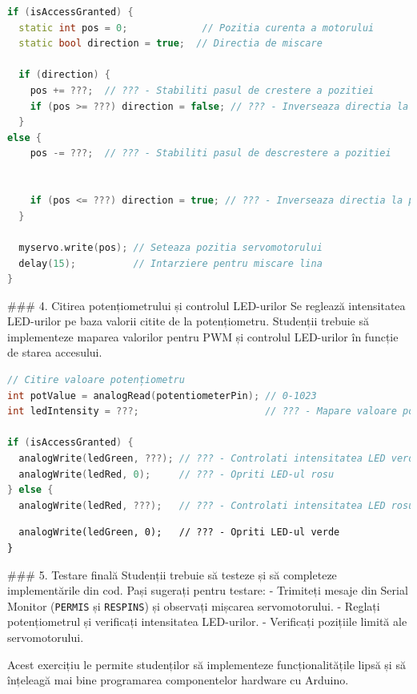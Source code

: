 \documentclass{report}
\begin{document}
\begin{lstlisting}[language=C++]
if (isAccessGranted) {
  static int pos = 0;             // Pozitia curenta a motorului
  static bool direction = true;  // Directia de miscare

  if (direction) {
    pos += ???;  // ??? - Stabiliti pasul de crestere a pozitiei
    if (pos >= ???) direction = false; // ??? - Inverseaza directia la limita
  }
else {
    pos -= ???;  // ??? - Stabiliti pasul de descrestere a pozitiei


    if (pos <= ???) direction = true; // ??? - Inverseaza directia la pozitia initiala
  }

  myservo.write(pos); // Seteaza pozitia servomotorului
  delay(15);          // Intarziere pentru miscare lina
}
\end{lstlisting}

### 4. Citirea potențiometrului și controlul LED-urilor
Se reglează intensitatea LED-urilor pe baza valorii citite de la potențiometru. Studenții trebuie să implementeze maparea valorilor pentru PWM și controlul LED-urilor în funcție de starea accesului.

\begin{lstlisting}[language=C++]
// Citire valoare potențiometru
int potValue = analogRead(potentiometerPin); // 0-1023
int ledIntensity = ???;                      // ??? - Mapare valoare potentiometru la intervalul 0-255

if (isAccessGranted) {
  analogWrite(ledGreen, ???); // ??? - Controlati intensitatea LED verde
  analogWrite(ledRed, 0);     // ??? - Opriti LED-ul rosu
} else {
  analogWrite(ledRed, ???);   // ??? - Controlati intensitatea LED rosu
  \end{lstlisting}
  \vspace*{1cm}
  \begin{lstlisting}
  analogWrite(ledGreen, 0);   // ??? - Opriti LED-ul verde
}
\end{lstlisting}

### 5. Testare finală
Studenții trebuie să testeze și să completeze implementările din cod. Pași sugerați pentru testare:
- Trimiteți mesaje din Serial Monitor (\texttt{PERMIS} și \texttt{RESPINS}) și observați mișcarea servomotorului.
- Reglați potențiometrul și verificați intensitatea LED-urilor.
- Verificați pozițiile limită ale servomotorului.

Acest exercițiu le permite studenților să implementeze funcționalitățile lipsă și să înțeleagă mai bine programarea componentelor hardware cu Arduino.
\end{document}
